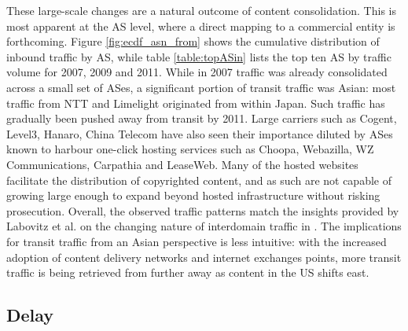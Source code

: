 

These large-scale changes are a natural outcome of content consolidation. This is most apparent at the AS level, where a direct mapping to a commercial entity is forthcoming.
Figure \ref{fig:ecdf_asn_from} shows the cumulative distribution of inbound traffic by AS, while table \ref{table:topASin} lists the top ten AS by traffic volume for 2007, 2009 and 2011.
While in 2007 traffic was already consolidated across a small set of ASes, a significant portion of transit traffic was Asian: most traffic from NTT and Limelight originated from within Japan. Such traffic has gradually been pushed away from transit by 2011.
Large carriers such as Cogent, Level3, Hanaro, China Telecom have also seen their importance diluted by ASes known to harbour one-click hosting services such as Choopa, Webazilla, WZ Communications, Carpathia and LeaseWeb.
Many of the hosted websites facilitate the distribution of copyrighted content, and as such are not capable of growing large enough to expand beyond hosted infrastructure without risking prosecution.
Overall, the observed traffic patterns match the insights provided by Labovitz et al. on the changing nature of interdomain traffic in \cite{Labovitz:2010p175}.
The implications for transit traffic from an Asian perspective is less intuitive: with the increased adoption of content delivery networks and internet exchanges points, more transit traffic is being retrieved from further away as content in the US shifts east.

\subsection{Delay}
